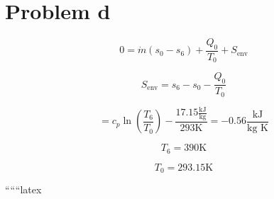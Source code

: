 \section*{Problem d}

\[
0 = \dot{m} (s_0 - s_6) + \frac{Q_0}{T_0} + S_{\text{env}}
\]

\[
S_{\text{env}} = s_6 - s_0 - \frac{Q_0}{T_0}
\]

\[
= c_p \ln \left( \frac{T_6}{T_0} \right) - \frac{17.15 \frac{\text{kJ}}{\text{kg}}}{293 \text{K}} = -0.56 \frac{\text{kJ}}{\text{kg K}}
\]

\[
T_6 = 390 \text{K}
\]

\[
T_0 = 293.15 \text{K}
\]

``````latex